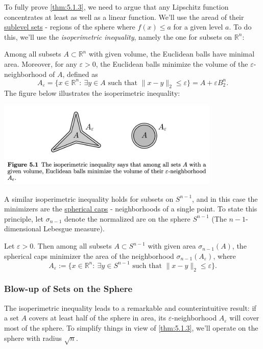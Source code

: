 To fully prove \cref{thm:5.1.3}, we need to argue that any Lipschitz function concentrates at least as well 
as a linear function. We'll use the aread of their \underline{sublevel sets} - regions of the sphere where 
$f(x) \leq a$ for a given level $a$. To do this, we'll use the \textit{isoperimetric inequality}, namely 
the one for subsets on $\mathbb{R}^n$: 

\begin{theorem}
\label{thm:5.1.4}
Among all subsets $A \subset \mathbb{R}^n$ with given volume, the Euclidean balls have minimal area. Moreover, 
for any $\varepsilon > 0$, the Euclidean balls minimize the volume of the $\varepsilon$-neighborhood of $A$, 
defined as 
\[ A_{\varepsilon} = \{ x \in \mathbb{R}^n: \ \exists y \in A \text{ such that } \lVert x - y \rVert_{2} 
\leq \varepsilon \} = A + \varepsilon B_2^n. \] 
The figure below illustrates the isoperimetric inequality:
\begin{center}
	\includegraphics[width=0.8\textwidth]{Chapter 5/fig5-1.png}
\end{center}
\end{theorem}

A similar isoperimetric inequality holds for subsets on $S^{n - 1}$, and in this case the minimizers are the 
\underline{spherical caps} - neighborhoods of a single point. To state this principle, let $\sigma_{n - 1}$ 
denote the normalized are on the sphere $S^{n - 1}$ (The $n - 1$-dimensional Lebesgue measure).

\begin{theorem}
\label{thm:5.1.5}
Let $\varepsilon > 0$. Then among all subsets $A \subset S^{n - 1}$ with given area $\sigma_{n - 1}(A)$, the 
spherical caps minimizer the area of the neighborhood $\sigma_{n - 1}(A_{\varepsilon})$, where 
\[ A_{\varepsilon} := \{ x \in \mathbb{R}^n: \ \exists y \in S^{n - 1} \text{ such that } 
\lVert x - y \rVert_{2} \leq \varepsilon \}. \]
\end{theorem}


\subsubsection{Blow-up of Sets on the Sphere}
The isoperimetric inequality leads to a remarkable and counterintuitive result: if a set $A$ covers at least 
half of the sphere in area, its $\varepsilon$-neighborhood $A_{\varepsilon}$ will cover most of the sphere. 
To simplify things in view of \cref{thm:5.1.3}, we'll operate on the sphere with radius $\sqrt{n}$.

